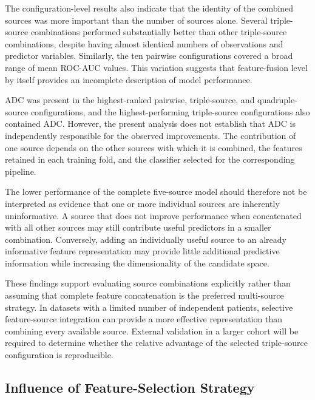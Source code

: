 \documentclass[12pt,twocolumn]{article}
\begin{document}
The configuration-level results also indicate that the identity of the
combined sources was more important than the number of sources alone.
Several triple-source combinations performed substantially better than
other triple-source combinations, despite having almost identical
numbers of observations and predictor variables. Similarly, the ten
pairwise configurations covered a broad range of mean ROC-AUC values.
This variation suggests that feature-fusion level by itself provides
an incomplete description of model performance.

ADC was present in the highest-ranked pairwise, triple-source, and
quadruple-source configurations, and the highest-performing
triple-source configurations also contained ADC. However, the present
analysis does not establish that ADC is independently responsible for
the observed improvements. The contribution of one source depends on
the other sources with which it is combined, the features retained in
each training fold, and the classifier selected for the corresponding
pipeline.

The lower performance of the complete five-source model should
therefore not be interpreted as evidence that one or more individual
sources are inherently uninformative. A source that does not improve
performance when concatenated with all other sources may still
contribute useful predictors in a smaller combination. Conversely,
adding an individually useful source to an already informative feature
representation may provide little additional predictive information
while increasing the dimensionality of the candidate space.

These findings support evaluating source combinations explicitly
rather than assuming that complete feature concatenation is the
preferred multi-source strategy. In datasets with a limited number of
independent patients, selective feature-source integration can provide
a more effective representation than combining every available source.
External validation in a larger cohort will be required to determine
whether the relative advantage of the selected triple-source
configuration is reproducible.












\subsection{Influence of Feature-Selection Strategy}
\label{subsec:discussion_feature_selection}
\end{document}
